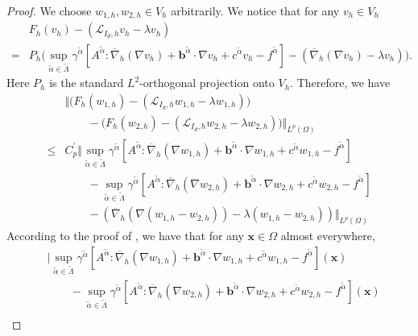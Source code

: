 \documentclass[12pt]{amsart}
\newcommand{\boldx}{\boldsymbol{x}}
\theoremstyle{definition}
\theoremstyle{remark}
\begin{document}
\begin{proof}
We choose $w_{1,h},w_{2,h} \in V_{h}$ arbitrarily. 
We notice that for any $v_{h}\in V_{h}$
\begin{align*}
& F_{h}(v_{h}) - (\mathcal{L}_{I_{d},h}v_{h}-\lambda v_{h}) \\
= & P_{h}\big( \sup_{\tilde{\alpha}\in \tilde{\Lambda}}\gamma^{\tilde{\alpha}}
[A^{\tilde{\alpha}}:\overline{\nabla}_{h}
(\nabla v_{h}) + \boldsymbol{b}^{\tilde{\alpha}}\cdot\nabla v_{h} 
+ c^{\tilde{\alpha}}v_{h} - f^{\tilde{\alpha}}] 
- (\overline{\nabla}_{h}(\nabla v_{h})-\lambda v_{h})\big).
\end{align*}
Here $P_{h}$ is the standard $L^{2}$-orthogonal projection onto $V_{h}$. 
Therefore, we have 
\begin{align}
\label{hjb_fem_opreator_projection}
& \Vert \big(F_{h}(w_{1,h})-(\mathcal{L}_{I_{d},h}w_{1,h}-\lambda 
w_{1,h})\big) \\
\nonumber
&\qquad - \big(F_{h}(w_{2,h})-(\mathcal{L}_{I_{d},h}w_{2,h}-\lambda 
w_{2,h})\big) \Vert_{L^{p}(\Omega)} \\
\nonumber
\leq & C_{p}^{\prime} \Vert \sup_{\tilde{\alpha}\in \tilde{\Lambda}}\gamma^{\tilde{\alpha}}
[A^{\tilde{\alpha}}:\overline{\nabla}_{h}
(\nabla w_{1,h}) + \boldsymbol{b}^{\tilde{\alpha}}\cdot\nabla w_{1,h} 
+ c^{\tilde{\alpha}}w_{1,h} - f^{\tilde{\alpha}}] \\
\nonumber 
& \qquad - \sup_{\tilde{\alpha}\in \tilde{\Lambda}}\gamma^{\tilde{\alpha}}
[A^{\tilde{\alpha}}:\overline{\nabla}_{h}
(\nabla w_{2,h}) + \boldsymbol{b}^{\tilde{\alpha}}\cdot\nabla w_{2,h} 
+ c^{\tilde{\alpha}}w_{2,h} - f^{\tilde{\alpha}}] \\
\nonumber 
& \qquad -(\overline{\nabla}_{h}(\nabla (w_{1,h}-w_{2,h}))-\lambda(w_{1,h}-w_{2,h}))
\Vert_{L^{p}(\Omega)}
\end{align}
According to the proof of \cite[Lemma~$1$]{SmearsSuli2014}, we have that 
for any $\boldx \in \Omega$ almost everywhere, 
\begin{align}
\label{hjb_fem_operator_diff}
& \vert \sup_{\tilde{\alpha}\in \tilde{\Lambda}}\gamma^{\tilde{\alpha}}
[A^{\tilde{\alpha}}:\overline{\nabla}_{h}
(\nabla w_{1,h}) + \boldsymbol{b}^{\tilde{\alpha}}\cdot\nabla w_{1,h} 
+ c^{\tilde{\alpha}}w_{1,h} - f^{\tilde{\alpha}}](\boldx) \\
\nonumber 
& \qquad - \sup_{\tilde{\alpha}\in \tilde{\Lambda}}\gamma^{\tilde{\alpha}}
[A^{\tilde{\alpha}}:\overline{\nabla}_{h}
(\nabla w_{2,h}) + \boldsymbol{b}^{\tilde{\alpha}}\cdot\nabla w_{2,h} 
+ c^{\tilde{\alpha}}w_{2,h} - f^{\tilde{\alpha}}](\boldx) \\

\end{align}
\end{proof}
\end{document}
